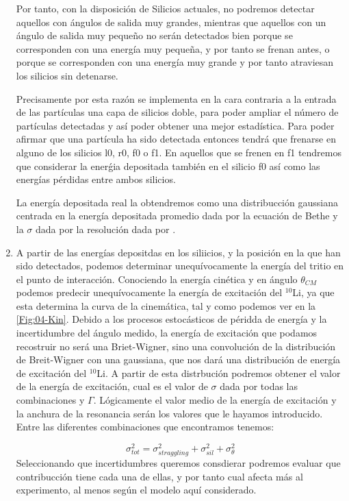 \begin{enumerate}
\begin{center}
        \label{Fig:04-Impacts}
    \end{center}
    

    Por tanto, con la disposición de Silicios actuales, no podremos detectar aquellos con ángulos de salida muy grandes, mientras que aquellos con un ángulo de salida muy pequeño no serán detectados bien porque se corresponden con una energía muy pequeña, y por tanto se frenan antes, o porque se corresponden con una energía muy grande y por tanto atraviesan los silicios sin detenarse. 

    Precisamente por esta razón se implementa en la cara contraria a la entrada de las partículas una capa de silicios doble, para poder ampliar el número de partículas detectadas y así poder obtener una mejor estadística. Para poder afirmar que una partícula ha sido detectada entonces tendrá que frenarse en alguno de los silicios l0, r0, f0 o f1. En aquellos que se frenen en f1 tendremos que considerar la enerǵia depositada también en el silicio f0 así como las energías pérdidas entre ambos silicios.

    La energía depositada real la obtendremos como una distribucción gaussiana centrada en la energía depositada promedio dada por la ecuación de Bethe y la $\sigma$ dada por la resolución dada por \label{Eq:Resolucion_Silicios}.

    \item A partir de las energías depositdas en los siliicios, y la posición en la que han sido detectados, podemos determinar unequívocamente la energía del tritio en el punto de interacción. Conociendo la energía cinética y en ángulo $\theta_{CM}$ podemos predecir unequívocamente la energía de excitación del $^{10}$Li, ya que esta determina la curva de la cinemática, tal y como podemos ver en la \cref{Fig:04-Kin}. Debido a los procesos estocásticos de péridda de energía y la incertidumbre del ángulo medido, la energía de excitación que podamos recostruir no será una Briet-Wigner, sino una convolución de la distribución de Breit-Wigner con una gaussiana, que nos dará una distribución de energía de excitación del $^{10}$Li. A partir de esta distrbución podremos obtener el valor de la energía de excitación, cual es el valor de $\sigma$ dada por todas las combinaciones y $\Gamma$. Lógicamente el valor medio de la energía de excitación y la anchura de la resonancia serán los valores que le hayamos introducido. Entre las diferentes combinaciones que encontramos tenemos:
    
    \begin{equation}
        \sigma_{tot}^2 = \sigma_{straggling}^2 + \sigma_{sil}^2 + \sigma_{\theta}^2 
    \end{equation}
    Seleccionando que incertidumbres queremos consdierar podremos evaluar que contribucción tiene cada una de ellas, y por tanto cual afecta más al experimento, al menos según el modelo aquí considerado. 

\end{enumerate}    
